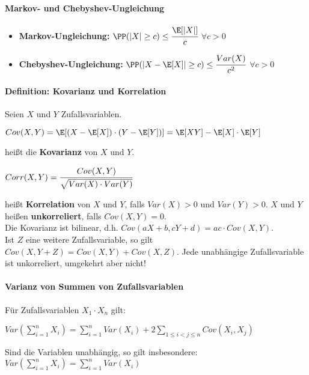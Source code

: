 \paragraph{Markov- und Chebyshev-Ungleichung}
\begin{itemize}
	\item \textbf{Markov-Ungleichung:} $\PP(|X|\geq c)\leq\cfrac{\E[|X|]}{c}$ \qquad$\forall c>0$
	\item \textbf{Chebyshev-Ungleichung:} $\PP(|X-\E[X]|\geq c)\leq\cfrac{Var(X)}{c^2}$ \qquad$\forall c>0$
\end{itemize}

\paragraph{Definition: Kovarianz und Korrelation}
Seien $X$ und $Y$ Zufallsvariablen.
\begin{tightcenter}
	$Cov(X,Y)=\E[(X-\E[X])\cdot(Y-\E[Y])]=\E[XY]-\E[X]\cdot\E[Y]$
\end{tightcenter}
heißt die \textbf{Kovarianz} von $X$ und $Y$.
\begin{tightcenter}
	$Corr(X,Y)=\cfrac{Cov(X,Y)}{\sqrt{Var(X)\cdot Var(Y)}}$
\end{tightcenter}
heißt \textbf{Korrelation} von $X$ und $Y$, falls $Var(X)>0$ und $Var(Y)>0$.
$X$ und $Y$ heißen \textbf{unkorreliert}, falls $Cov(X,Y)=0$.\\
Die Kovarianz ist bilinear, d.h. $Cov(aX+b,cY+d)=ac\cdot Cov(X,Y)$.\\
Ist $Z$ eine weitere Zufallsvariable, so gilt $Cov(X,Y+Z)=Cov(X,Y)+Cov(X,Z)$.
Jede unabhängige Zufallsvariable ist unkorreliert, umgekehrt aber nicht!

\paragraph{Varianz von Summen von Zufallsvariablen}
Für Zufallsvariablen $X_1\cdot X_n$ gilt:
\begin{tightcenter}
	$Var(\sum\limits_{i=1}^{n}X_i)=\sum\limits_{i=1}^{n}Var(X_i)+2\sum\limits_{1\leq i<j\leq n}Cov(X_i,X_j)$
\end{tightcenter}
Sind die Variablen unabhängig, so gilt insbesondere: $Var(\sum\limits_{i=1}^{n}X_i)=\sum\limits_{i=1}^{n}Var(X_i)$


